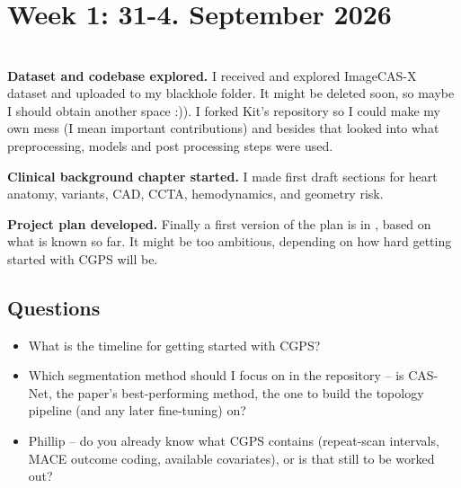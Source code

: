 \documentclass[11pt,a4paper]{article}
\begin{document}

\section{Week 1: 31-4. September 2026}




\section*{}
\newpage

\sectionprogress

\textbf{Dataset and codebase explored.} I received and explored ImageCAS-X dataset and uploaded to my blackhole folder. It might be deleted soon, so maybe I should obtain another space :)). I forked Kit's repository so I could make my own mess (I mean important contributions) and besides that looked into what preprocessing, models and post processing steps were used. 

\textbf{Clinical background chapter started.} I made first draft sections for heart anatomy, variants, CAD, CCTA, hemodynamics, and geometry risk.

\textbf{Project plan developed.} Finally a first version of the plan is in , based
on what is known so far. It might be too ambitious, depending on how hard getting started with CGPS will be.


\subsection{Questions}

\begin{itemize}
  \item What is the timeline for getting started with CGPS?
  \item Which segmentation method should I focus on in the repository -- is CAS-Net, the
    paper's best-performing method, the one to build the topology pipeline (and any later
    fine-tuning) on?
  \item Phillip -- do you already know what CGPS contains (repeat-scan intervals, MACE outcome
    coding, available covariates), or is that still to be worked out?
\end{itemize}
\newpage

\newpage

\newpage

\newpage

\newpage

\newpage 

\printbibliography
\end{document}
